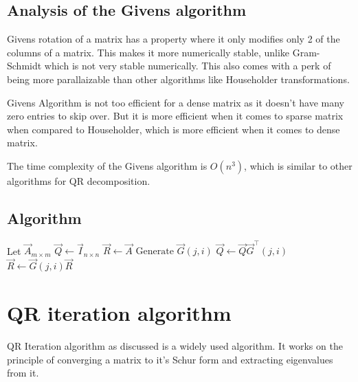 \documentclass[journal]{IEEEtran}
\numberwithin{equation}{section}
\begin{document}
% 

\subsection{Analysis of the Givens algorithm}

Givens rotation of a matrix has a property where it only modifies only 2 of the columns of a matrix. This makes it more numerically stable, unlike Gram-Schmidt which is not very stable numerically. This also comes with a perk of being more parallaizable than other algorithms like Householder transformations. 

Givens Algorithm is not too efficient for a dense matrix as it doesn't have many zero entries to skip over. But it is more efficient when it comes to sparse matrix when compared to Householder, which is more efficient when it comes to dense matrix.

The time complexity of the Givens algorithm is $O(n^3)$, which is similar to other algorithms for QR decomposition.

\subsection{Algorithm}

\begin{algorithmic}[1]
    \State Let $\vec{A}_{m \times m}$
    \State $\vec{Q} \gets \vec{I}_{n \times n}$
    \State $\vec{R} \gets \vec{A}$
                \State $\text{Generate } \vec{G}(j , i)$
                \State $\vec{Q} \gets \vec{Q}\vec{G}^\top(j, i)$
                \State $\vec{R} \gets \vec{G}(j ,i )\vec{R}$
            \EndIf
        \EndFor
    \EndFor
\end{algorithmic}

\section{QR iteration algorithm}

QR Iteration algorithm as discussed is a widely used algorithm. It works on the principle of converging a matrix to it's Schur form and extracting eigenvalues from it. 
\end{document}
